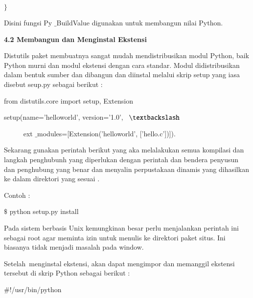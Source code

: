 \documentclass[a4paper,12pt]{report}
\begin{document}
\noindent 
 $  \}  $ \par
\vspace{12pt}
\vspace{12pt}
\noindent 
 \hspace*{0.5in} Disini fungsi Py $  \_  $BuildValue digunakan untuk membangun nilai Python.  \par
\vspace{12pt}
\vspace{12pt}
\noindent 
\textbf{4.2 Membangun dan Menginstal Ekstensi} \par
\vspace{12pt}
\vspace{12pt}
\noindent 
 \hspace*{0.5in} Distutils paket membuatnya sangat mudah mendistribusikan modul Python, baik Python murni dan modul ekstensi dengan cara standar. Modul didistribusikan dalam bentuk sumber dan dibangun dan diinstal melalui skrip setup yang iasa disebut seup.py sebagai berikut : \par
\noindent 
from distutils.core import setup, Extension \par
\noindent 
setup(name='helloworld', version='1.0',~  $  \textbackslash  $ \par
\noindent 
~~~~~ ext $  \_  $modules=[Extension('helloworld', ['hello.c'])]). \par
\vspace{12pt}
\noindent 
 \hspace*{0.5in} Sekarang gunakan perintah berikut yang aka melalakukan semua kompilasi dan langkah penghubunh yang diperlukan dengan perintah dan bendera penyusun dan penghubung yang benar dan menyalin perpustakaan dinamis yang dihasilkan ke dalam direktori yang sesuai . \par
\vspace{12pt}
\noindent 
Contoh : \par
\noindent 
 $  \$  $ python setup.py install \par
\vspace{12pt}
\noindent 
 \hspace*{0.5in} Pada sistem berbasis Unix kemungkinan besar perlu menjalankan perintah ini sebagai root agar meminta izin untuk menulis ke direktori paket situs. Ini biasanya tidak menjadi masalah pada window. \par
Setelah~menginstal ekstensi, akan dapat mengimpor dan memanggil ekstensi tersebut di skrip Python  sebagai berikut : \par
\noindent 
 $  \#  $!/usr/bin/python \par
\end{document}
